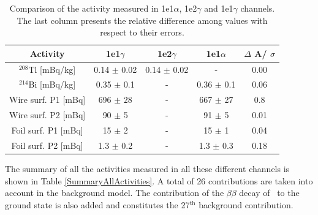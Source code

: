 \documentclass[main.tex]{subfiles}
\begin{document}
\begin{table}[h!]
\centering
\begin{tabular}{c|c|c|c|c}
Activity & 1e1$\gamma$ & 1e2$\gamma$ & 1e1$\alpha$ & $\Delta$ A/ $\sigma$ \\[0.1cm]
\toprule
$^{\text{208}}$Tl [mBq/kg] & 0.14 $\pm$ 0.02 & 0.14 $\pm$ 0.02 & - & 0.00 \\[0.1cm]
$^{\text{214}}$Bi [mBq/kg] & 0.35 $\pm$ 0.1  & -               & 0.36 $\pm$ 0.1 & 0.06 \\[0.1cm]
Wire surf. P1 [mBq]        & 696  $\pm$ 28   & -               & 667  $\pm$ 27  & 0.8  \\[0.1cm]
Wire surf. P2 [mBq]        & 90   $\pm$ 5    & -               & 91   $\pm$ 5   & 0.01 \\[0.1cm]
Foil surf. P1 [mBq]        & 15   $\pm$ 2    & -               & 15   $\pm$ 1   & 0.04 \\[0.1cm]
Foil surf. P2 [mBq]        & 1.3  $\pm$ 0.2  & -               & 1.3  $\pm$ 0.3 & 0.18 \\[0.1cm]
\bottomrule
\end{tabular}
\caption{Comparison of the activity measured in 1e1$\alpha$, 1e2$\gamma$ and 1e1$\gamma$ channels. The last column presents the relative difference among values with respect to their errors.}
\label{Table:BkgValidation}
\end{table}


\NI The summary of all the activities measured in all these different channels is shown in Table \ref{SummaryAllActivities}. A total of 26 contributions are taken into account in the background model. The contribution of the $\beta \beta$ decay of \Cd~to the ground state is also added and constitutes the 27$^{\text{th}}$ background contribution.
\end{document}
